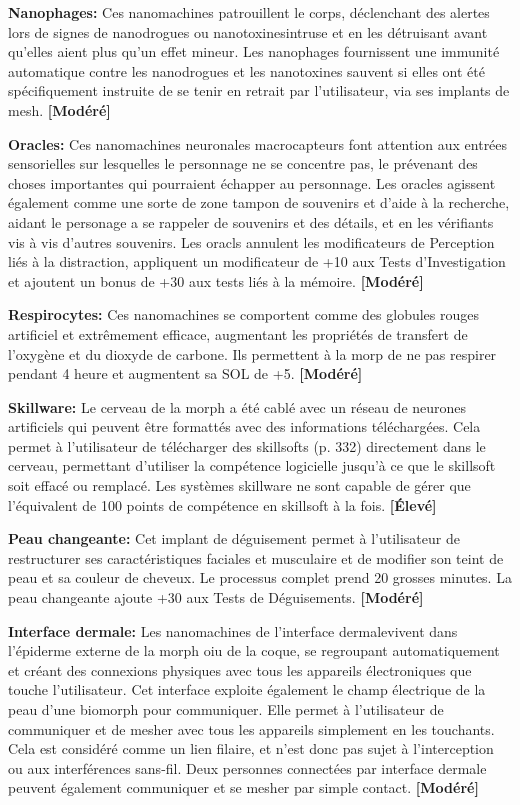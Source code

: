 {{\textbf{Nanophages:} Ces nanomachines patrouillent le corps, déclenchant des alertes lors de signes de nanodrogues ou nanotoxinesintruse et en les détruisant avant qu'elles aient plus qu'un effet mineur. Les nanophages fournissent une immunité automatique contre les nanodrogues et les nanotoxines sauvent si elles ont été spécifiquement instruite de se tenir en retrait par l'utilisateur, via ses implants de mesh. \textbf{[Modéré]} 

\textbf{Oracles:} Ces nanomachines neuronales macrocapteurs font attention aux entrées sensorielles sur lesquelles le personnage ne se concentre pas, le prévenant des choses importantes qui pourraient échapper au personnage. Les oracles agissent également comme une sorte de zone tampon de souvenirs et d'aide à la recherche, aidant le personage a se rappeler de souvenirs et des détails, et en les vérifiants vis à vis d'autres souvenirs. Les oracls annulent les modificateurs de Perception liés à la distraction, appliquent un modificateur de +10 aux Tests d'Investigation et ajoutent un bonus de +30 aux tests liés à la mémoire. \textbf{[Modéré]} 

\textbf{Respirocytes:} Ces nanomachines se comportent comme des globules rouges artificiel et extrêmement efficace, augmentant les propriétés de transfert de l'oxygène et du dioxyde de carbone. Ils permettent à la morp de ne pas respirer pendant 4 heure et augmentent sa SOL de +5. \textbf{[Modéré]} 

\textbf{Skillware:} Le cerveau  de la morph a été cablé avec un réseau de neurones artificiels qui peuvent être formattés avec des informations téléchargées. Cela permet à l'utilisateur de télécharger des skillsofts (p. 332) directement dans le cerveau, permettant d'utiliser la compétence logicielle jusqu'à ce que le skillsoft soit effacé ou remplacé. Les systèmes skillware ne sont capable de gérer que l'équivalent de 100 points de compétence en skillsoft à la fois. \textbf{[Élevé]} 

\textbf{Peau changeante:} Cet implant de déguisement permet à l'utilisateur de restructurer ses caractéristiques faciales et musculaire et de modifier son teint de peau et sa couleur de cheveux. Le processus complet prend 20 grosses minutes. La peau changeante ajoute +30 aux Tests de Déguisements. \textbf{[Modéré]} 

\textbf{Interface dermale:} Les nanomachines de l'interface dermalevivent dans l'épiderme externe de la morph oiu de la coque, se regroupant automatiquement et créant des connexions physiques avec tous les appareils électroniques que touche l'utilisateur. Cet interface exploite également le champ électrique de la peau d'une biomorph pour communiquer. Elle permet à l'utilisateur de communiquer et de mesher avec tous les appareils simplement en les touchants. Cela est considéré comme un lien filaire, et n'est donc pas sujet à l'interception ou aux interférences sans-fil. Deux personnes connectées par interface dermale peuvent également communiquer et se mesher par simple contact. \textbf{[Modéré]} 

}}
